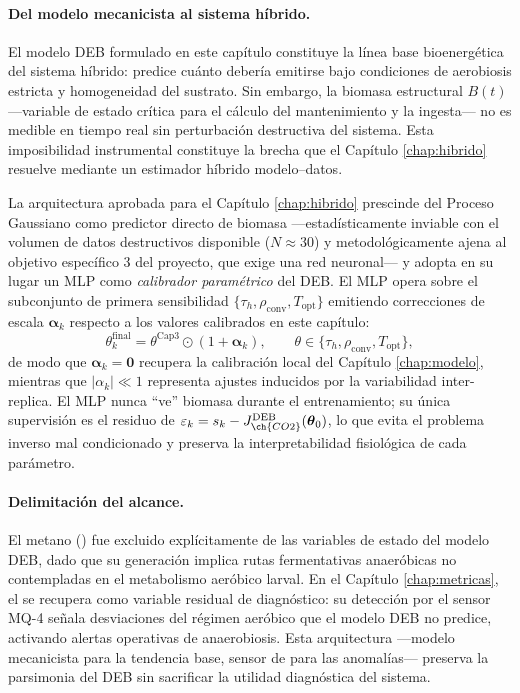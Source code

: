 \paragraph{Del modelo mecanicista al sistema híbrido.} El modelo DEB formulado en este capítulo constituye la línea base bioenergética del sistema híbrido: predice cuánto  debería emitirse bajo condiciones de aerobiosis estricta y homogeneidad del sustrato. Sin embargo, la biomasa estructural $B(t)$ —variable de estado crítica para el cálculo del mantenimiento y la ingesta— no es medible en tiempo real sin perturbación destructiva del sistema. Esta imposibilidad instrumental constituye la brecha que el Capítulo \ref{chap:hibrido} resuelve mediante un estimador híbrido modelo--datos.

La arquitectura aprobada para el Capítulo \ref{chap:hibrido} prescinde del Proceso Gaussiano como predictor directo de biomasa —estadísticamente inviable con el volumen de datos destructivos disponible ($N \approx 30$) y metodológicamente ajena al objetivo específico 3 del proyecto, que exige una red neuronal— y adopta en su lugar un MLP como \emph{calibrador paramétrico} del DEB. El MLP opera sobre el subconjunto de primera sensibilidad $\{\tau_h, \rho_{\mathrm{conv}}, T_{\mathrm{opt}}\}$ emitiendo correcciones de escala $\boldsymbol{\alpha}_k$ respecto a los valores calibrados en este capítulo:
\begin{equation*}
    \theta_k^{\mathrm{final}} = \theta^{\mathrm{Cap3}} \odot (1 + \boldsymbol{\alpha}_k), \qquad \theta \in \{\tau_h, \rho_{\mathrm{conv}}, T_{\mathrm{opt}}\},
\end{equation*}
de modo que $\boldsymbol{\alpha}_k = \mathbf{0}$ recupera la calibración local del Capítulo \ref{chap:modelo}, mientras que $|\alpha_k| \ll 1$ representa ajustes inducidos por la variabilidad inter-replica. El MLP nunca ``ve'' biomasa durante el entrenamiento; su única supervisión es el residuo de  $\varepsilon_k = s_k - J_{\ch{CO2}}^{\mathrm{DEB}}(\boldsymbol{\theta}_0)$, lo que evita el problema inverso mal condicionado y preserva la interpretabilidad fisiológica de cada parámetro.

\paragraph{Delimitación del alcance.} El metano () fue excluido explícitamente de las variables de estado del modelo DEB, dado que su generación implica rutas fermentativas anaeróbicas no contempladas en el metabolismo aeróbico larval. En el Capítulo \ref{chap:metricas}, el  se recupera como variable residual de diagnóstico: su detección por el sensor MQ-4 señala desviaciones del régimen aeróbico que el modelo DEB no predice, activando alertas operativas de anaerobiosis. Esta arquitectura —modelo mecanicista para la tendencia base, sensor de  para las anomalías— preserva la parsimonia del DEB sin sacrificar la utilidad diagnóstica del sistema.

